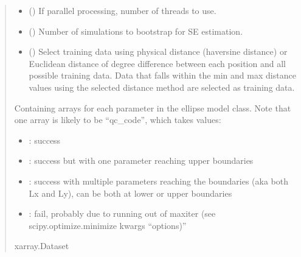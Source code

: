 \documentclass[letterpaper,10pt,english]{sphinxmanual}
\begin{document}
\begin{fulllineitems}
\begin{fulllineitems}
\begin{quote}
\begin{description}
\begin{itemize}
\item {}
\sphinxAtStartPar
{} () \textendash{} If parallel processing, number of threads to use.

\item {}
\sphinxAtStartPar
{} () \textendash{} Number of simulations to bootstrap for SE estimation.

\item {}
\sphinxAtStartPar
{} () \textendash{} Select training data using physical distance (haversine distance) or
Euclidean distance of degree difference between each position and
all possible training data. Data that falls within the min and max
distance values using the selected distance method are selected as
training data.

\end{itemize}

\sphinxAtStartPar

\sphinxAtStartPar
{} \textendash{} Containing arrays for each parameter in the ellipse model class.
Note that one array is likely to be “qc\_code”, which takes values:
\begin{itemize}
\item {}
: success

\item {}
: success but with one parameter reaching upper
boundaries

\item {}
: success with multiple parameters reaching the
boundaries (aka both Lx and Ly), can be both at lower or
upper boundaries

\item {}
: fail, probably due to running out of maxiter (see
scipy.optimize.minimize kwargs “options)”

\end{itemize}


\sphinxAtStartPar
xarray.Dataset

\end{description}\end{quote}

\end{fulllineitems}


\end{fulllineitems}
\end{document}
